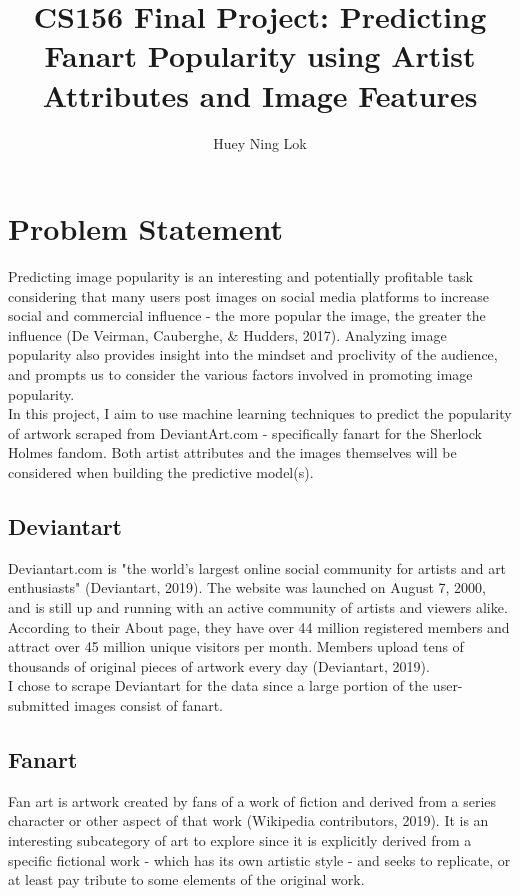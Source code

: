 \documentclass[11pt]{article}
\title{CS156 Final Project: Predicting Fanart Popularity using Artist Attributes and
Image Features}
\author{Huey Ning Lok}
\begin{document}
    
    
    \maketitle
    
\section{Problem Statement}

Predicting image popularity is an interesting and potentially profitable
task considering that many users post images on social media platforms
to increase social and commercial influence - the more popular the
image, the greater the influence (De Veirman, Cauberghe, \& Hudders, 2017). Analyzing image popularity also provides insight into the mindset and proclivity of the audience, and prompts us to consider the various
factors involved in promoting image popularity.\\

In this project, I aim to use machine learning techniques to predict the
popularity of artwork scraped from DeviantArt.com - specifically fanart
for the Sherlock Holmes fandom. Both artist attributes and the images
themselves will be considered when building the predictive model(s).

\subsection{Deviantart}

Deviantart.com is "the world's largest online social community for
artists and art enthusiasts" (Deviantart, 2019). The website was
launched on August 7, 2000, and is still up and running with an active
community of artists and viewers alike. According to their About page,
they have over 44 million registered members and attract over 45 million
unique visitors per month. Members upload tens of thousands of original
pieces of artwork every day (Deviantart, 2019).\\

I chose to scrape Deviantart for the data since a large portion of the
user-submitted images consist of fanart.

\subsection{Fanart}

Fan art is artwork created by fans of a work of fiction and derived from
a series character or other aspect of that work (Wikipedia contributors,
2019). It is an interesting subcategory of art to explore since it is
explicitly derived from a specific fictional work - which has its own
artistic style - and seeks to replicate, or at least pay tribute to some
elements of the original work.
\newpage
\end{document}
